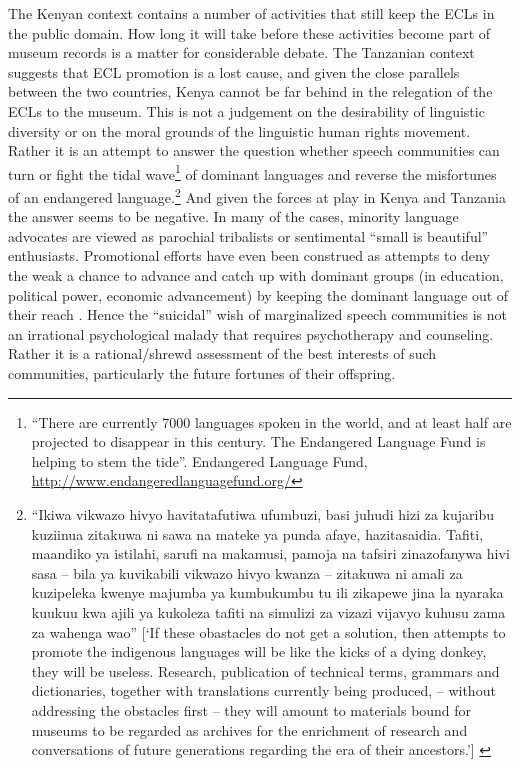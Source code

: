 \documentclass[output=paper,colorlinks,citecolor=brown]{langscibook}
\begin{document}
The Kenyan context contains a number of activities that still keep the ECLs in the public domain. How long it will take before these activities become part of museum records is a matter for considerable debate. The Tanzanian context suggests that ECL promotion is a lost cause, and given the close parallels between the two countries, Kenya cannot be far behind in the relegation of the ECLs to the museum. This is not a judgement on the desirability of linguistic diversity or on the moral grounds of the linguistic human rights movement. Rather it is an attempt to answer the question whether speech communities can turn or fight the tidal wave\footnote{“There are currently 7000 languages spoken in the world, and at least half are projected to disappear in this century. The Endangered Language Fund is helping to stem the tide”. Endangered Language Fund, \url{http://www.endangeredlanguagefund.org/}} of dominant languages and reverse the misfortunes of an endangered language.\footnote{“Ikiwa vikwazo hivyo havitatafutiwa ufumbuzi, basi juhudi hizi za kujaribu kuziinua zitakuwa ni sawa na mateke ya punda afaye, hazitasaidia. Tafiti, maandiko ya istilahi, sarufi na makamusi, pamoja na tafsiri zinazofanywa hivi sasa – bila ya kuvikabili vikwazo hivyo kwanza – zitakuwa ni amali za kuzipeleka kwenye majumba ya kumbukumbu tu ili zikapewe jina la nyaraka kuukuu kwa ajili ya kukoleza tafiti na simulizi za vizazi vijavyo kuhusu zama za wahenga wao” [`If these obastacles do not get a solution, then attempts to promote the indigenous languages will be like the kicks of a dying donkey, they will  be useless. Research, publication of technical terms, grammars and dictionaries, together with translations currently being produced, -- without addressing the obstacles first – they will amount to materials bound for museums to be regarded as archives for the enrichment of research and conversations of future generations regarding the era of their ancestors.'] \citep[99]{Madumulla2007}} And given the forces at play in Kenya and Tanzania the answer seems to be negative. In many of the cases, minority language advocates are viewed as parochial tribalists or sentimental “small is beautiful” enthusiasts. Promotional efforts have even been construed as attempts to deny the weak a chance to advance and catch up with dominant groups (in education, political power, economic advancement) by keeping the dominant language out of their reach \citep{Mkude2002}. Hence the “suicidal” wish of marginalized speech communities is not an irrational psychological malady that requires psychotherapy and counseling. Rather it is a rational\slash shrewd assessment of the best interests of such communities, particularly the future fortunes of their offspring.

% 
% 


{\sloppy\printbibliography[heading=subbibliography,notkeyword=this]}
\end{document}
